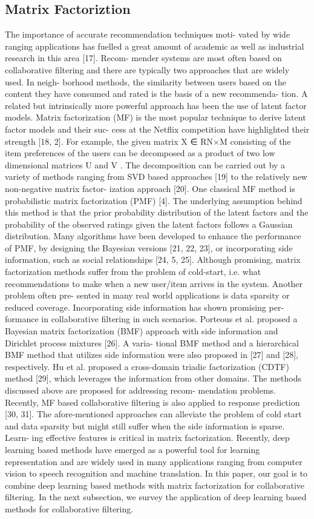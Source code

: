 \documentclass{sig-alternate-05-2015}
\begin{document}
\subsection{Matrix Factoriztion}
The importance of accurate recommendation techniques moti- vated by wide ranging applications has fuelled a great amount of academic as well as industrial research in this area [17]. Recom- mender systems are most often based on collaborative filtering and there are typically two approaches that are widely used. In neigh- borhood methods, the similarity between users based on the content they have consumed and rated is the basis of a new recommenda- tion. A related but intrinsically more powerful approach has been the use of latent factor models. Matrix factorization (MF) is the most popular technique to derive latent factor models and their suc- cess at the Netflix competition have highlighted their strength [18, 2]. For example, the given matrix X ∈ RN×M consisting of the item preferences of the users can be decomposed as a product of two low dimensional matrices U and V . The decomposition can be carried out by a variety of methods ranging from SVD based approaches [19] to the relatively new non-negative matrix factor- ization approach [20]. One classical MF method is probabilistic matrix factorization (PMF) [4]. The underlying assumption behind this method is that the prior probability distribution of the latent factors and the probability of the observed ratings given the latent
factors follows a Gaussian distribution. Many algorithms have been developed to enhance the performance of PMF, by designing the Bayesian versions [21, 22, 23], or incorporating side information, such as social relationships [24, 5, 25].
Although promising, matrix factorization methods suffer from the problem of cold-start, i.e. what recommendations to make when a new user/item arrives in the system. Another problem often pre- sented in many real world applications is data sparsity or reduced coverage. Incorporating side information has shown promising per- formance in collaborative filtering in such scenarios. Porteous et al. proposed a Bayesian matrix factorization (BMF) approach with side information and Dirichlet process mixtures [26]. A varia- tional BMF method and a hierarchical BMF method that utilizes side information were also proposed in [27] and [28], respectively. Hu et al. proposed a cross-domain triadic factorization (CDTF) method [29], which leverages the information from other domains. The methods discussed above are proposed for addressing recom- mendation problems. Recently, MF based collaborative filtering is also applied to response prediction [30, 31]. The afore-mentioned approaches can alleviate the problem of cold start and data sparsity but might still suffer when the side information is sparse. Learn- ing effective features is critical in matrix factorization. Recently, deep learning based methods have emerged as a powerful tool for learning representation and are widely used in many applications ranging from computer vision to speech recognition and machine translation. In this paper, our goal is to combine deep learning based methods with matrix factorization for collaborative filtering. In the next subsection, we survey the application of deep learning based methods for collaborative filtering.
\end{document}

